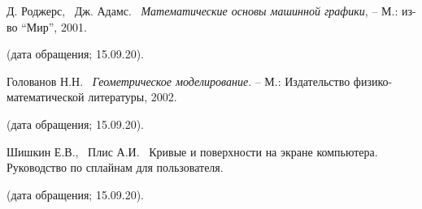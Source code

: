 \begin{thebibliography}{99}

Д. Роджерс, \, Дж. Адамс. \, {\itshape Математические основы машинной графики}, -- М.: из-во \enquote{Мир}, 2001.

(дата обращения; 15.09.20).

Голованов Н.Н. \, {\itshape Геометрическое моделирование}. -- М.: Издательство физико-математической литературы, 2002.

(дата обращения; 15.09.20).

Шишкин Е.В., \, Плис А.И. \, Кривые и поверхности на экране компьютера. Руководство по сплайнам для пользователя.

(дата обращения; 15.09.20).

\end{thebibliography}
\pagebreak